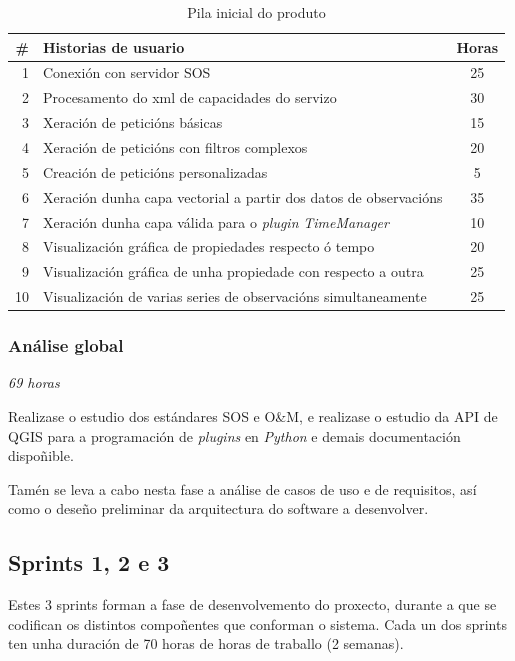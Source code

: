 \begin{table}
\centering
\begin{tabularx}{\textwidth}{rXc} \toprule
	\# & Historias de usuario & Horas \\
	\midrule
	1 & Conexión con servidor SOS & 25 \\
	2 & Procesamento do xml de capacidades do servizo & 30 \\
	3 & Xeración de peticións básicas & 15 \\
	4 & Xeración de peticións con filtros complexos & 20 \\
	5 & Creación de peticións personalizadas & 5 \\
	6 & Xeración dunha capa vectorial a partir dos datos de observacións & 35\\
	7 & Xeración dunha capa válida para o \emph{plugin} \emph{TimeManager} & 10\\
	8 & Visualización gráfica de propiedades respecto ó tempo & 20\\
	9 & Visualización gráfica de unha propiedade con respecto a outra & 25\\
	10 & Visualización de varias series de observacións simultaneamente & 25\\
	\bottomrule
\end{tabularx}
\caption{Pila inicial do produto}
\label{tab:productBacklog}
\end{table}

\subsubsection{Análise global}
\textit{69 horas}

Realizase o estudio dos estándares SOS e O\&M, e realizase o estudio da API de QGIS\cite{APIQGIS} para a programación de \emph{plugins} en \emph{Python} e demais documentación dispoñible\cite{PyQGIS}.

Tamén se leva a cabo nesta fase a análise de casos de uso e de requisitos, así como o deseño preliminar da arquitectura do software a desenvolver.

\subsection{Sprints 1, 2 e 3}
Estes 3 sprints forman a fase de desenvolvemento do proxecto, durante a que se codifican os distintos compoñentes que conforman o sistema. Cada un dos sprints ten unha duración de 70 horas de horas de traballo (2 semanas).

